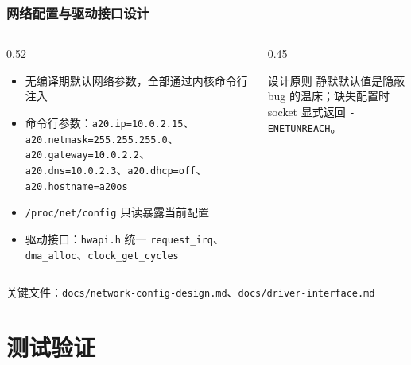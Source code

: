 \documentclass[aspectratio=1610]{beamer}
\newcommand{\code}[1]{\texttt{\footnotesize #1}}
\begin{document}
\begin{frame}
    \frametitle{网络配置与驱动接口设计}
    \begin{columns}
        \begin{column}{0.52\textwidth}
            \footnotesize
            \begin{itemize}
                \item 无编译期默认网络参数，全部通过内核命令行注入
                \item 命令行参数：\code{a20.ip=10.0.2.15}、\code{a20.netmask=255.255.255.0}、\code{a20.gateway=10.0.2.2}、\code{a20.dns=10.0.2.3}、\code{a20.dhcp=off}、\code{a20.hostname=a20os}
                \item \code{/proc/net/config} 只读暴露当前配置
                \item 驱动接口：\code{hwapi.h} 统一 \code{request\_irq}、\code{dma\_alloc}、\code{clock\_get\_cycles}
            \end{itemize}
        \end{column}
        \begin{column}{0.45\textwidth}
            \footnotesize
            \begin{block}{设计原则}
                静默默认值是隐蔽 bug 的温床；缺失配置时 socket 显式返回 \code{-ENETUNREACH}。
            \end{block}
        \end{column}
    \end{columns}
    \vspace{0.3em}
    \small 关键文件：\code{docs/network-config-design.md}、\code{docs/driver-interface.md}
\end{frame}

\section{测试验证}
\end{document}

